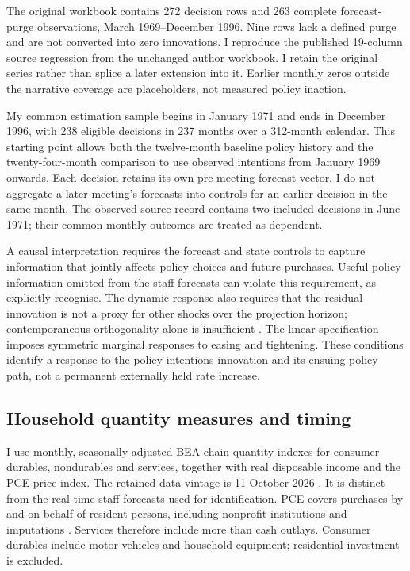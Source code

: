 \documentclass[11pt,a4paper]{article}
\begin{document}
The original workbook contains 272 decision rows and 263 complete forecast-purge observations, March 1969--December 1996. Nine rows lack a defined purge and are not converted into zero innovations. I reproduce the published 19-column source regression from the unchanged author workbook. I retain the original series rather than splice a later extension into it. Earlier monthly zeros outside the narrative coverage are placeholders, not measured policy inaction.

My common estimation sample begins in January 1971 and ends in December 1996, with 238 eligible decisions in 237 months over a 312-month calendar. This starting point allows both the twelve-month baseline policy history and the twenty-four-month comparison to use observed intentions from January 1969 onwards. Each decision retains its own pre-meeting forecast vector. I do not aggregate a later meeting's forecasts into controls for an earlier decision in the same month. The observed source record contains two included decisions in June 1971; their common monthly outcomes are treated as dependent.

A causal interpretation requires the forecast and state controls to capture information that jointly affects policy choices and future purchases. Useful policy information omitted from the staff forecasts can violate this requirement, as \citet{RomerRomer2004} explicitly recognise. The dynamic response also requires that the residual innovation is not a proxy for other shocks over the projection horizon; contemporaneous orthogonality alone is insufficient \citep{StockWatson2018}. The linear specification imposes symmetric marginal responses to easing and tightening. These conditions identify a response to the policy-intentions innovation and its ensuing policy path, not a permanent externally held rate increase.

\subsection{Household quantity measures and timing}

I use monthly, seasonally adjusted BEA chain quantity indexes for consumer durables, nondurables and services, together with real disposable income and the PCE price index. The retained data vintage is 11 October 2026 \citep{Data2026}. It is distinct from the real-time staff forecasts used for identification. PCE covers purchases by and on behalf of resident persons, including nonprofit institutions and imputations \citep{BEA2024}. Services therefore include more than cash outlays. Consumer durables include motor vehicles and household equipment; residential investment is excluded.
\end{document}
